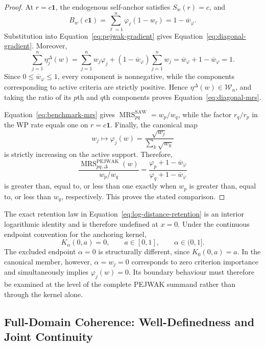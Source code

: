 \documentclass[reqno,11pt]{amsart}
\theoremstyle{definition}
\theoremstyle{plain}
\theoremstyle{remark}
\begin{document}
\begin{proof}
At $r=c\mathbf1$, the endogenous self-anchor satisfies $S_w(r)=c$, and
\[
B_w(c\mathbf1)
=
\sum_{\ell=1}^{n}
\varphi_\ell(1-w_\ell)
=
1-\overline w_\varphi.
\]
Substitution into Equation~\eqref{eq:pejwak-gradient} gives
Equation~\eqref{eq:diagonal-gradient}. Moreover,
\[
\sum_{j=1}^{n}\eta_j^\Delta(w)
=
\sum_{j=1}^{n}w_j\varphi_j
+
\left(1-\overline w_\varphi\right)
\sum_{j=1}^{n}w_j
=
\overline w_\varphi+1-\overline w_\varphi
=
1.
\]
Since $0\leq\overline w_\varphi\leq1$, every component is
nonnegative, while the components corresponding to active criteria are
strictly positive. Hence $\eta^\Delta(w)\in\mathcal W_n$, and taking
the ratio of its $p$th and $q$th components proves
Equation~\eqref{eq:diagonal-mrs}.

Equation~\eqref{eq:benchmark-mrs} gives
$\operatorname{MRS}_{pq}^{\mathrm{SAW}}=w_p/w_q$, while the factor
$r_q/r_p$ in the WP rate equals one on $r=c\mathbf1$. Finally, the
canonical map
\[
w_j\longmapsto
\varphi_j(w)
=
\frac{\sqrt{w_j}}{\sum_k\sqrt{w_k}}
\]
is strictly increasing on the active support. Therefore,
\[
\frac{
\operatorname{MRS}_{pq,\Delta}^{\mathrm{PEJWAK}}(w)
}{
w_p/w_q
}
=
\frac{
\varphi_p+1-\overline w_\varphi
}{
\varphi_q+1-\overline w_\varphi
}
\]
is greater than, equal to, or less than one exactly when $w_p$ is
greater than, equal to, or less than $w_q$, respectively. This proves
the stated comparison.
\end{proof}

The exact retention law in
Equation~\eqref{eq:log-distance-retention} is an interior logarithmic
identity and is therefore undefined at $x=0$. Under the continuous
endpoint convention for the anchoring kernel,
\begin{equation}
K_\alpha(0,a)=0,
\qquad
a\in[0,1],
\qquad
\alpha\in(0,1].
\label{eq:zero-score-kernel}
\end{equation}
The excluded endpoint $\alpha=0$ is structurally different, since
$K_0(0,a)=a$. In the canonical member, however, $\alpha=w_j=0$
corresponds to zero criterion importance and simultaneously implies
$\varphi_j(w)=0$. Its boundary behaviour must therefore be examined at
the level of the complete PEJWAK summand rather than through the kernel
alone.
\subsection{Full-Domain Coherence: Well-Definedness and Joint Continuity}
\label{subsec:boundary-joint-continuity}
\end{document}
